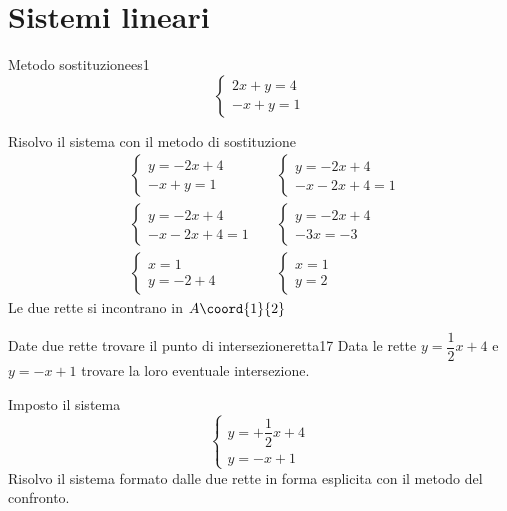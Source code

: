 \chapter{Sistemi lineari}
\begin{esempiot}{Metodo sostituzione}{es1}
\[\begin{cases} 
2x+y=4\\
-x+y=1
\end{cases}\]
\end{esempiot}
Risolvo il sistema con il metodo di sostituzione
\begin{align*}
&\begin{cases} 
y=-2x+4\\
-x+y=1
\end{cases}&&\begin{cases} 
y=-2x+4\\
-x-2x+4=1
\end{cases}\\
&\begin{cases} 
y=-2x+4\\
-x-2x+4=1
\end{cases}&&\begin{cases} 
y=-2x+4\\
-3x=-3
\end{cases}\\
&\begin{cases} 
x=1\\
y=-2+4
\end{cases}&&
\begin{cases} 
x=1\\
y=2
\end{cases}
\end{align*}
Le due rette si incontrano in $A\coord{1}{2}$
\begin{esempiot}{Date due rette trovare il punto di intersezione}{retta17}
	Data le rette $y=\dfrac{1}{2}x+4$ e $y=-x+1$ trovare la loro eventuale intersezione.
\end{esempiot}
Imposto il sistema 
\[\begin{cases} 
y=+\dfrac{1}{2}x+4\\
y=-x+1
\end{cases}\]
Risolvo il sistema formato dalle due rette in forma esplicita con il metodo del confronto.
